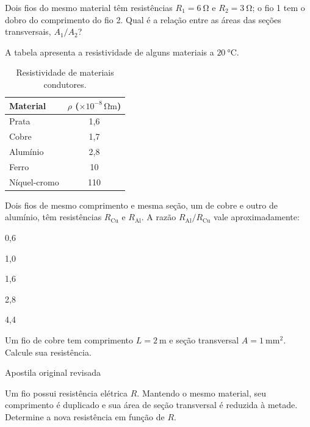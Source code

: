 \begin{questao}[2]{}

Dois fios do mesmo material têm resistências $R_1 = \SI{6}{\ohm}$ e
$R_2 = \SI{3}{\ohm}$; o fio 1 tem o dobro do comprimento do fio 2. Qual é a relação
entre as áreas das seções transversais, $A_1/A_2$?


\end{questao}
\begin{questao}[2]{}

A tabela apresenta a resistividade de alguns materiais a $\SI{20}{\celsius}$.

\begin{table}[H]
\centering\small\sffamily
\begin{tabular}{@{}l c@{}}
\toprule
\textbf{Material} & \textbf{$\rho$ ($\times10^{-8}\,\si{\ohm\meter}$)}\\
\midrule
Prata      & 1,6\\
Cobre      & 1,7\\
Alumínio   & 2,8\\
Ferro      & 10\\
Níquel-cromo & 110\\
\bottomrule
\end{tabular}
\caption{Resistividade de materiais condutores.}
\end{table}

Dois fios de mesmo comprimento e mesma seção, um de cobre e outro de alumínio,
têm resistências $R_{\text{Cu}}$ e $R_{\text{Al}}$. A razão
$R_{\text{Al}}/R_{\text{Cu}}$ vale aproximadamente:
\begin{alternativas}[3]
\item 0,6
\item 1,0
\item 1,6
\item 2,8
\item 4,4
\end{alternativas}


\end{questao}
\begin{questao}[2]{}

Um fio de cobre tem comprimento $L = \SI{2}{\meter}$ e seção transversal
$A = \SI{1}{\milli\meter\squared}$. Calcule sua resistência.


\end{questao}
\begin{questao}[2]{Apostila original revisada}

Um fio possui resistência elétrica $R$. Mantendo o mesmo material, seu comprimento é
duplicado e sua área de seção transversal é reduzida à metade. Determine a nova
resistência em função de $R$.


\end{questao}

